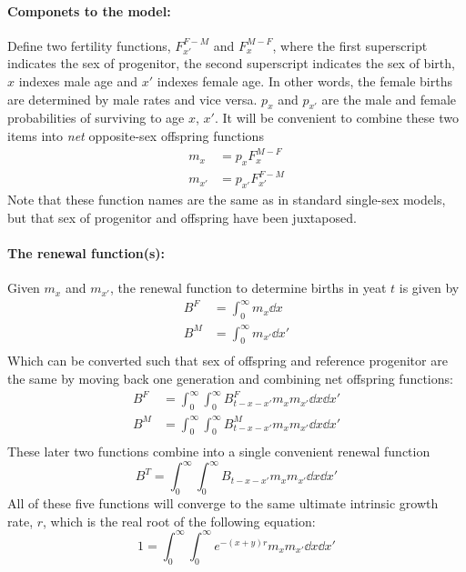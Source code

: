 \paragraph{Componets to the model: }
Define two fertility functions, $F_{x'}^{F-M}$ and $F_x^{M-F}$, where the first
superscript indicates the sex of progenitor, the second superscript indicates
the sex of birth, $x$ indexes male age and $x'$ indexes female age. In
other words, the female births are determined by male rates and vice versa.
$p_x$ and $p_{x'}$ are the male and female probabilities of surviving to age 
$x$, $x'$. It will be convenient to combine these two items into \textit{net}
opposite-sex offspring functions
\begin{align}
m_x &= p_xF_x^{M-F}\\
m_{x'} &= p_{x'}F_{x'}^{F-M}
\end{align}
Note that these function names are the same as in standard single-sex models,
but that sex of progenitor and offspring have been juxtaposed.
\paragraph{The renewal function(s): }
Given $m_x$ and $m_{x'}$, the renewal function to determine births in yeat $t$
is given by
\begin{align}
B^F &= \int_0^\infty m_x \dd x\\
B^M &= \int_0^\infty m_{x'} \dd x'\\
\end{align}
Which can be converted such that sex of offspring and reference
progenitor are the same by moving back one generation and combining net
offspring functions:
\begin{align}
B^F &= \int_0^\infty \int_0^\infty B^F_{t-x-x'} m_xm_{x'}\dd x \dd x'\\
B^M &= \int_0^\infty \int_0^\infty B^M_{t-x-x'} m_xm_{x'}\dd x \dd x'\\
\end{align}
These later two functions combine into a single convenient renewal function
\begin{equation}
B^T = \int_0^\infty \int_0^\infty B_{t-x-x'}m_xm_{x'}\dd x \dd x'
\end{equation}
All of these five functions will converge to the same ultimate
intrinsic growth rate, $r$, which is the real root of the following equation: 
\begin{equation}
1 = \int_0^\infty \int_0^\infty e^{-(x+y)r}m_xm_{x'}\dd x \dd x'
\end{equation}

